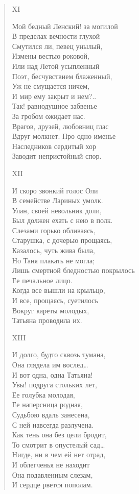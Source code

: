 \begin{verse}
XI

Мой бедный Ленский! за могилой\\
В пределах вечности глухой\\
Смутился ли, певец унылый,\\
Измены вестью роковой,\\
Или над Летой усыпленный\\
Поэт, бесчувствием блаженный,\\
Уж не смущается ничем,\\
И мир ему закрыт и нем?..\\
Так! равнодушное забвенье\\
За гробом ожидает нас.\\
Врагов, друзей, любовниц глас\\
Вдруг молкнет. Про одно именье\\
Наследников сердитый хор\\
Заводит непристойный спор.

XII

И скоро звонкий голос Оли\\
В семействе Лариных умолк.\\
Улан, своей невольник доли,\\
Был должен ехать с нею в полк.\\
Слезами горько обливаясь,\\
Старушка, с дочерью прощаясь,\\
Казалось, чуть жива была,\\
Но Таня плакать не могла;\\
Лишь смертной бледностью покрылось\\
Ее печальное лицо.\\
Когда все вышли на крыльцо,\\
И все, прощаясь, суетилось\\
Вокруг кареты молодых,\\
Татьяна проводила их.

XIII

И долго, будто сквозь тумана,\\
Она глядела им вослед…\\
И вот одна, одна Татьяна!\\
Увы! подруга стольких лет,\\
Ее голубка молодая,\\
Ее наперсница родная,\\
Судьбою вдаль занесена,\\
С ней навсегда разлучена.\\
Как тень она без цели бродит,\\
То смотрит в опустелый сад…\\
Нигде, ни в чем ей нет отрад,\\
И облегченья не находит\\
Она подавленным слезам,\\
И сердце рвется пополам.


\end{verse}
